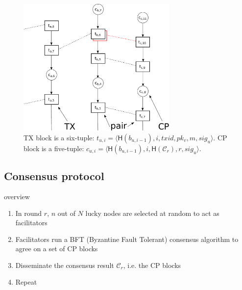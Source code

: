 \documentclass{beamer}
\newcommand{\C}{\mathcal{C}}
\begin{document}
\begin{frame}{\subsecname}
  \begin{figure}[h]
  \includegraphics[width=0.7\textwidth]{trustchain-bad-cp}
  \centering
  \caption{TX block is a six-tuple: $t_{u, i} = \langle \textsf{H}(b_{u, i - 1}), i, txid, pk_v, m, sig_u \rangle$.
    CP block is a five-tuple: $c_{u, i} = \langle \textsf{H}(b_{u, i-1}), i, \textsf{H}(\C_r), r, sig_u \rangle$.}
  \end{figure}
\end{frame}

\subsection{Consensus protocol}
\begin{frame}{\subsecname overview}
  \begin{enumerate}
    \item In round $r$, $n$ out of $N$ lucky nodes are selected at random to act as facilitators
    \item Facilitators run a BFT (Byzantine Fault Tolerant) consensus algorithm to
      agree on a set of CP blocks
    \item Disseminate the consensus result $\C_r$, i.e. the CP blocks
    \item Repeat
  \end{enumerate}
\end{frame}
\end{document}
